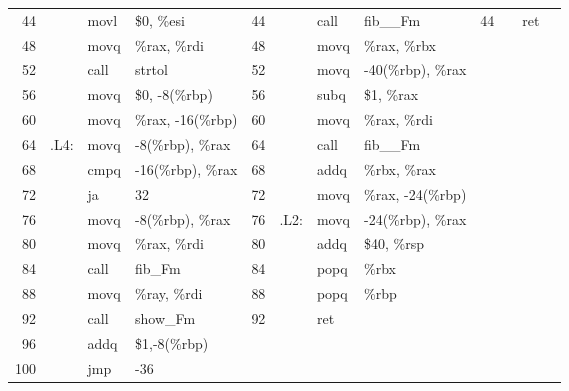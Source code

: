 \documentclass{ti2}
\begin{document}
\begin{minipage}{\linewidth}
{\begin{tabular}{|r|rll||r|rll||r|rll|}
		44 &       & movl  & \$0, \%esi                      & 44 &            & call  & fib\_\_Fm         & 44 &             & ret   &  \\
		48 &       & movq  & \%rax, \%rdi                    & 48 &            & movq  & \%rax, \%rbx      &    &             &       &  \\
		52 &       & call  & strtol                          & 52 &            & movq  & -40(\%rbp), \%rax &    &             &       &  \\
		56 &       & movq  & \$0, -8(\%rbp)                  & 56 &            & subq  & \$1, \%rax        &    &             &       &  \\
		60 &       & movq  & \%rax, -16(\%rbp)               & 60 &            & movq  & \%rax, \%rdi      &    &             &       &  \\
		64 &  .L4: & movq  & -8(\%rbp), \%rax                & 64 &            & call  & fib\_\_Fm         &    &             &       &  \\
		68 &       & cmpq  & -16(\%rbp), \%rax               & 68 &            & addq  & \%rbx, \%rax      &    &             &       &  \\
		72 &       & ja    & 32                              & 72 &            & movq  & \%rax, -24(\%rbp) &    &             &       &  \\
		76 &       & movq  & -8(\%rbp), \%rax                & 76 &       .L2: & movq  & -24(\%rbp), \%rax &    &             &       &  \\
		80 &       & movq  & \%rax, \%rdi                    & 80 &            & addq  & \$40, \%rsp       &    &             &       &  \\
		84 &       & call  & fib\_Fm                         & 84 &            & popq  & \%rbx             &    &             &       &  \\
		88 &       & movq  & \%ray, \%rdi                    & 88 &            & popq  & \%rbp             &    &             &       &  \\
		92 &       & call  & show\_Fm                        & 92 &            & ret   &                   &    &             &       &  \\
		96 &       & addq  & \$1,-8(\%rbp)                   &    &            &       &                   &    &             &       &  \\
		100 &       & jmp   & -36                             &    &            &       &                   &    &             &       &  \\

\end{tabular}}
\end{minipage}
\end{document}
